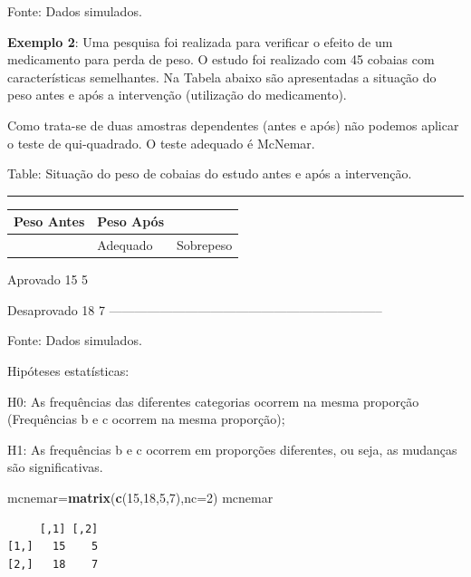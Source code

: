 \documentclass[12pt,brazil,oneside]{book}
\newenvironment{Shaded}{\begin{snugshade}}{\end{snugshade}}
\newcommand{\DataTypeTok}[1]{\textcolor[rgb]{0.13,0.29,0.53}{#1}}
\newcommand{\DecValTok}[1]{\textcolor[rgb]{0.00,0.00,0.81}{#1}}
\newcommand{\KeywordTok}[1]{\textcolor[rgb]{0.13,0.29,0.53}{\textbf{#1}}}
\newcommand{\NormalTok}[1]{#1}
\newcommand{\OperatorTok}[1]{\textcolor[rgb]{0.81,0.36,0.00}{\textbf{#1}}}
\begin{document}
Fonte: Dados simulados.

\textbf{Exemplo 2}: Uma pesquisa foi realizada para verificar o efeito
de um medicamento para perda de peso. O estudo foi realizado com 45
cobaias com características semelhantes. Na Tabela abaixo são
apresentadas a situação do peso antes e após a intervenção (utilização
do medicamento).

Como trata-se de duas amostras dependentes (antes e após) não podemos
aplicar o teste de qui-quadrado. O teste adequado é McNemar.

Table: \label{tab:tamprop}Situação do peso de cobaias do estudo antes e após
a intervenção.

\begin{center}\rule{0.5\linewidth}{\linethickness}\end{center}

\begin{longtable}[]{@{}lll@{}}
\toprule
\textbf{Peso Antes} & \textbf{Peso Após} &\tabularnewline
\midrule
\endhead
& Adequado & Sobrepeso\tabularnewline
\bottomrule
\end{longtable}

Aprovado 15 5

Desaprovado 18 7
-----------------------------------------------------------------

Fonte: Dados simulados.

Hipóteses estatísticas:

H0: As frequências das diferentes categorias ocorrem na mesma proporção
(Frequências b e c ocorrem na mesma proporção);

H1: As frequências b e c ocorrem em proporções diferentes, ou seja, as
mudanças são significativas.

\begin{Shaded}
\begin{Highlighting}[]
\NormalTok{mcnemar=}\KeywordTok{matrix}\NormalTok{(}\KeywordTok{c}\NormalTok{(}\DecValTok{15}\NormalTok{,}\DecValTok{18}\NormalTok{,}\DecValTok{5}\NormalTok{,}\DecValTok{7}\NormalTok{),}\DataTypeTok{nc=}\DecValTok{2}\NormalTok{)}
\NormalTok{mcnemar}
\end{Highlighting}
\end{Shaded}

\begin{verbatim}
     [,1] [,2]
[1,]   15    5
[2,]   18    7
\end{verbatim}

\begin{Shaded}
\end{Shaded}
\end{document}
